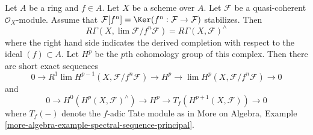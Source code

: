 \begin{lemma}
\label{lemma-formal-functions}
\begin{reference}
\cite[Lemma 1.6]{Bhatt-local}
\end{reference}
Let $A$ be a ring and $f \in A$. Let $X$ be a scheme over $A$.
Let $\mathcal{F}$ be a quasi-coherent $\mathcal{O}_X$-module.
Assume that $\mathcal{F}[f^n] = \Ker(f^n : \mathcal{F} \to \mathcal{F})$
stabilizes. Then
$$
R\Gamma(X, \lim \mathcal{F}/f^n\mathcal{F}) =
R\Gamma(X, \mathcal{F})^\wedge
$$
where the right hand side indicates the derived completion
with respect to the ideal $(f) \subset A$. Let $H^p$ be the
$p$th cohomology group of this complex. Then there are short
exact sequences
$$
0 \to R^1\lim H^{p - 1}(X, \mathcal{F}/f^n\mathcal{F})
\to H^p \to \lim H^p(X, \mathcal{F}/f^n\mathcal{F}) \to 0
$$
and
$$
0 \to H^0(H^p(X, \mathcal{F})^\wedge) \to H^p \to
T_f(H^{p + 1}(X, \mathcal{F})) \to 0
$$
where $T_f(-)$ denote the $f$-adic Tate module as in
More on Algebra, Example
\ref{more-algebra-example-spectral-sequence-principal}.
\end{lemma}


